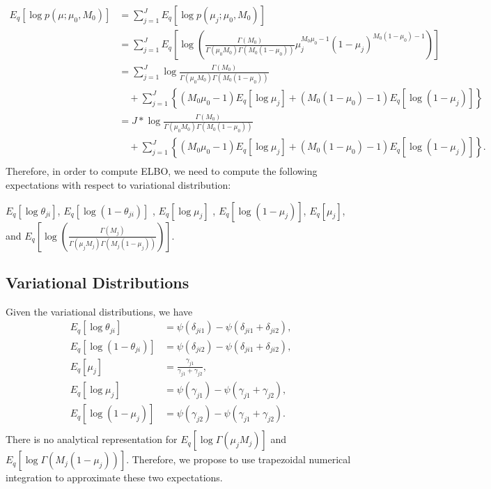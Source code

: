 \documentclass[11pt,reqno]{amsart}
\begin{document}
\begin{equation}
\begin{split}
\label{mu}
E_q \left[ \log p\left(\mu ; \mu_0, M_0 \right)\right] &= \sum_{j=1}^{J} E_q  \left[ \log p\left( \mu_j; \mu_0, M_0 \right) \right] \\
&= \sum_{j=1}^{J} E_q  \left[ \log \left( \frac{ \Gamma(M_0) } { \Gamma(\mu_0 M_0) \Gamma(M_0 (1-\mu_0)) } \mu_j^{M_0\mu_0 -1} (1 - \mu_j)^{M_0 ( 1 - \mu_0) - 1} \right) \right] \\
&= \sum_{j=1}^{J} \log \frac{ \Gamma(M_0) } { \Gamma(\mu_0 M_0) \Gamma(M_0 (1-\mu_0))} \\
&\quad + \sum_{j=1}^{J} \left\lbrace (M_0\mu_0 -1)E_q  \left[ \log \mu_j \right] + (M_0 ( 1 - \mu_0) - 1) E_q  \left[ \log (1 - \mu_j)\right]\right\rbrace  \\
&= J* \log \frac{ \Gamma(M_0) } { \Gamma(\mu_0 M_0) \Gamma(M_0 (1-\mu_0))} \\
&\quad + \sum_{j=1}^{J} \left\lbrace (M_0\mu_0 -1)E_q  \left[ \log \mu_j \right] + (M_0 ( 1 - \mu_0) - 1) E_q  \left[ \log (1 - \mu_j)\right]\right\rbrace.  \\
\end{split}
\end{equation}
Therefore, in order to compute ELBO, we need to compute the following expectations with respect to variational distribution:

$ E_q \left[ \log \theta_{ji} \right] $, $ E_q\left[ \log \left( 1 - \theta_{ji}\right) \right] $ , $ E_q  \left[ \log \mu_j \right] $ , $ E_q  \left[ \log (1 - \mu_j)\right] $, $ E_q \left[ \mu_j \right] $, and $ E_q\left[ \log \left( \frac{ \Gamma(M_j) } { \Gamma(\mu_j M_j) \Gamma(M_j (1-\mu_j)) }\right)\right] $.

\subsection{Variational Distributions}
\label{appendix:var}
Given the variational distributions, we have
\begin{align}
E_q \left[ \log \theta_{ji} \right] &= \psi(\delta_{ji1}) - \psi(\delta_{ji1}+\delta_{ji2}) \nonumber, \\
E_q \left[ \log \left( 1 - \theta_{ji}\right) \right]&= \psi(\delta_{ji2}) - \psi(\delta_{ji1}+\delta_{ji2}) \nonumber, \\
E_q \left[ \mu_j \right] &= \frac{\gamma_{j1}}{\gamma_{j1} + \gamma_{j2}} \nonumber, \\
E_q  \left[ \log \mu_j \right] &= \psi(\gamma_{j1}) - \psi(\gamma_{j1}+\gamma_{j2}) \nonumber, \\
E_q  \left[ \log (1 - \mu_j)\right] &= \psi(\gamma_{j2}) - \psi(\gamma_{j1}+\gamma_{j2})\nonumber. \\
\end{align}
There is no analytical representation for $  E_q  \left[ \log \Gamma(\mu_j M_j) \right] $ and $ E_q  \left[ \log \Gamma(M_j (1-\mu_j)) \right] $.
Therefore, we propose to use trapezoidal numerical integration to approximate these two expectations.
\end{document}
